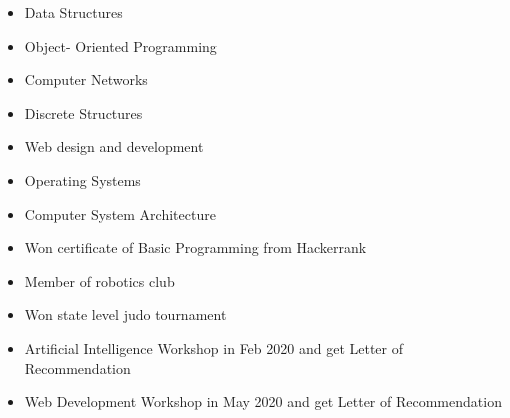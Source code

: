 













\medskip
{}

\begin{itemize}
    \item Data Structures
    \item Object- Oriented Programming
    \item Computer Networks
    \item Discrete Structures
    \item Web design and development %
    \item Operating Systems
    \item Computer System Architecture
\end{itemize}

\begin{itemize}
    \item Won certificate of Basic Programming from Hackerrank
    \item Member of robotics club
    \item Won state level judo tournament
\end{itemize}
\smallskip
\begin{itemize}
\item  Artificial Intelligence Workshop in Feb 2020 and get Letter of Recommendation

\item Web Development Workshop in May 2020  and get Letter of Recommendation

\end{itemize}